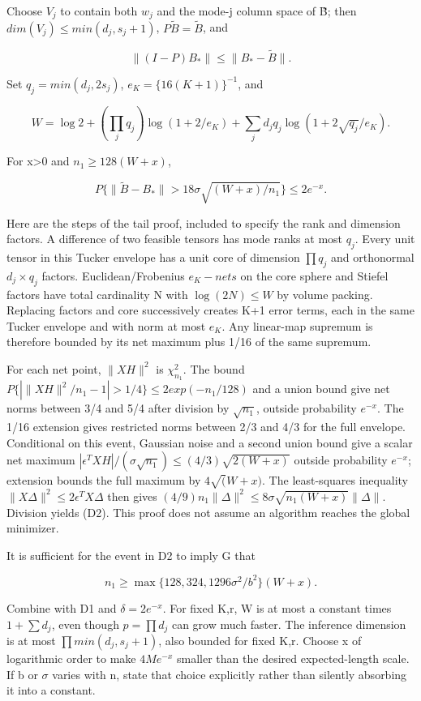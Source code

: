 \documentclass[
  11pt,
]{article}
\begin{document}
Choose \(V_j\) to contain both \(w_j\) and the mode-j column space of B̃;
then \(dim(V_j)\le min(d_j,s_j+1)\), \(P\widetilde B=\widetilde B\), and

\[
 \|(I-P)B_*\|\le\|B_*-\widetilde B\|.
\]

Set \(q_j=min(d_j,2s_j)\), \(e_K=\{16(K+1)\}^{-1}\), and

\[
 W=\log2+\left(\prod_jq_j\right)\log(1+2/e_K)
       +\sum_jd_jq_j\log(1+2\sqrt{q_j}/e_K).
\]

For x\textgreater0 and \(n_1\ge 128(W+x)\),

\[
 P\{\|\widetilde B-B_*\|>18\sigma\sqrt{(W+x)/n_1}\}
       \le2e^{-x}. \tag{D2}
\]

Here are the steps of the tail proof, included to specify the rank and
dimension factors. A difference of two feasible tensors has mode ranks
at most \(q_j\). Every unit tensor in this Tucker envelope has a unit
core of dimension \(\prod q_j\) and orthonormal \(d_j\times q_j\)
factors. Euclidean/Frobenius \(e_K-nets\) on the core sphere and Stiefel
factors have total cardinality N with \(\operatorname{log}(2N)\le W\) by
volume packing. Replacing factors and core successively creates K+1
error terms, each in the same Tucker envelope and with norm at most
\(e_K\). Any linear-map supremum is therefore bounded by its net maximum
plus 1/16 of the same supremum.

For each net point, \(\|XH\|^{2}\) is \(\chi ^{2}_{n_1}\). The bound
\(P\{| \|XH\|^{2}/n_1-1 |>1/4\}\le 2exp(-n_1/128)\) and a union bound
give net norms between 3/4 and 5/4 after division by \(\sqrt{n_1}\),
outside probability \(e^{-x}\). The 1/16 extension gives restricted
norms between 2/3 and 4/3 for the full envelope. Conditional on this
event, Gaussian noise and a second union bound give a scalar net maximum
\(|\epsilon ^TXH|/(\sigma \sqrt{n_1})\le (4/3)\sqrt {2(W+x)}\) outside
probability \(e^{-x}\); extension bounds the full maximum by
\(4\sqrt (W+x)\). The least-squares inequality
\(\|X\Delta \|^{2}\le 2\epsilon ^TX\Delta\) then gives
\((4/9)n_1\|\Delta \|^{2}\le 8\sigma \sqrt {n_1(W+x)}\|\Delta \|\).
Division yields (D2). This proof does not assume an algorithm reaches
the global minimizer.

It is sufficient for the event in D2 to imply G that

\[
 n_1\ge\max\{128,324,1296\sigma^2/b^2\}(W+x).
\]

Combine with D1 and \(\delta =2e^{-x}\). For fixed K,r, W is at most a
constant times \(1+\sum d_j\), even though \(p=\prod d_j\) can grow much
faster. The inference dimension is at most \(\prod min(d_j,s_j+1)\),
also bounded for fixed K,r. Choose x of logarithmic order to make
\(4Me^{-x}\) smaller than the desired expected-length scale. If b or
\(\sigma\) varies with n, state that choice explicitly rather than
silently absorbing it into a constant.
\end{document}
